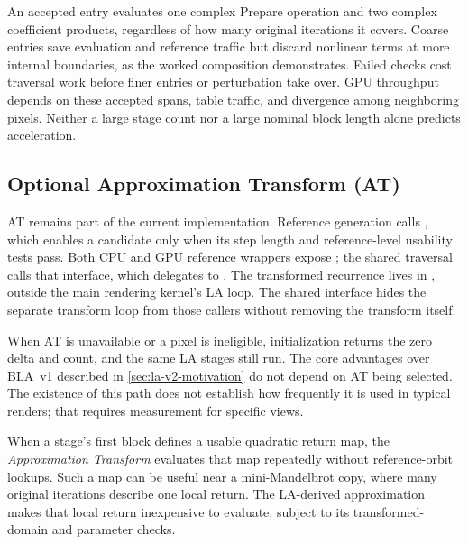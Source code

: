 An accepted entry evaluates one complex Prepare operation and two complex
coefficient products, regardless of how many original iterations it covers.
Coarse entries save evaluation and reference traffic but discard nonlinear
terms at more internal boundaries, as the worked composition demonstrates.
Failed checks cost traversal work before finer entries or perturbation take
over. GPU throughput depends on these accepted spans, table traffic, and
divergence among neighboring pixels. Neither a large stage count nor a large
nominal block length alone predicts acceleration.

\subsection{Optional Approximation Transform (AT)}
\label{sec:attractor-transform}

AT remains part of the current implementation. Reference generation
calls , which enables a candidate
only when its step length and reference-level usability tests pass.
Both CPU and GPU reference wrappers expose ;
the shared traversal calls that interface, which delegates to
. The transformed recurrence lives in
, outside the main rendering kernel's LA loop.
The shared interface hides the separate transform loop from those
callers without removing the transform itself.

When AT is unavailable or a pixel is ineligible, initialization
returns the zero delta and count, and the same LA stages still run.
The core advantages over BLA~v1 described in
\cref{sec:la-v2-motivation} do not depend on AT being selected. The
existence of this path does not establish how frequently it is used
in typical renders; that requires measurement for specific views.

When a stage's first block defines a usable quadratic return map, the
\emph{Approximation Transform} evaluates that map repeatedly without
reference-orbit lookups. Such a map can be useful near a mini-Mandelbrot
copy, where many original iterations describe one local return. The
LA-derived approximation makes that local return inexpensive to
evaluate, subject to its transformed-domain and parameter checks.


